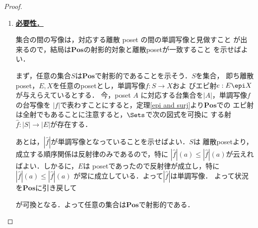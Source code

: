\documentclass[a4j]{ltjsarticle}
\newcommand{\Pos}{\mathbf{Pos}}
\begin{document}
\begin{proof}
 \begin{enumerate}
  \item \underline{\bfseries 必要性．}

	集合の間の写像は，対応する離散 poset の間の単調写像と見做すこと
	が出来るので，結局は$\Pos$の射影的対象と離散posetが一致すること
	を示せばよい．

	まず，任意の集合$S$は$\Pos$で射影的であることを示そう．$S$を集合，
	即ち離散poset，$E, X$を任意のposetとし，単調写像$f: S \to X$およ
	びエピ射$e: E \epi X$が与えらえているとする．
	今，poset $A$ に対応する台集合を$|A|$，単調写像$f$の台写像を
	$|f|$で表わすことにすると，定理\ref{epi and surj}より$\Pos$での
	エピ射は全射でもあることに注意すると，$\Sets$で次の図式を可換に
	する射$\hat{f}: |S| \to |E|$が存在する．

        \begin{center}
        \end{center}

	あとは，$|\hat{f}|$が単調写像となっていることを示せばよい．$S$は
	離散posetより，成立する順序関係は反射律のみであるので，特に
	$|\hat{f}|(a) \leq |\hat{f}|(a)$が云えればよい．しかるに，$E$は
	posetであったので反射律が成立し，特に$|\hat{f}|(a) \leq
	|\hat{f}|(a)$ が常に成立している．よって$|\hat{f}|$は単調写像．
	よって状況を$\Pos$に引き戻して
        \begin{center}
        \end{center}
	が可換となる．よって任意の集合は$\Pos$で射影的である．


\end{enumerate}
\end{proof}
\end{document}
